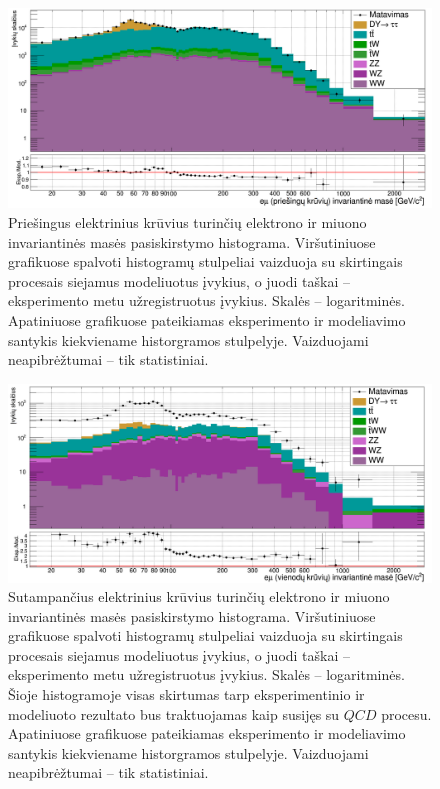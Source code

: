 \documentclass[a4paper, 12pt]{article}
\newcommand{\QCD}{QC\! D}
\begin{document}
\begin{figure}[H]
	\includegraphics[width=\linewidth]{emuMassOS_BIG.png}
	\caption{\label{fig:emuOS} \small
		Priešingus elektrinius krūvius turinčių elektrono ir miuono invariantinės masės pasiskirstymo histograma.
		Viršutiniuose grafikuose spalvoti histogramų stulpeliai vaizduoja su skirtingais procesais siejamus modeliuotus įvykius,
		o juodi taškai -- eksperimento metu užregistruotus įvykius.
		Skalės -- logaritminės.
		Apatiniuose grafikuose pateikiamas eksperimento ir modeliavimo santykis kiekviename historgramos stulpelyje.
		Vaizduojami neapibrėžtumai -- tik statistiniai.
	}
\end{figure}

\begin{figure}[H]
	\includegraphics[width=\linewidth]{emuMassSS_BIG.png}
	\caption{\label{fig:emuSS} \small
		Sutampančius elektrinius krūvius turinčių elektrono ir miuono invariantinės masės pasiskirstymo histograma.
		Viršutiniuose grafikuose spalvoti histogramų stulpeliai vaizduoja su skirtingais procesais siejamus modeliuotus įvykius,
		o juodi taškai -- eksperimento metu užregistruotus įvykius.
		Skalės -- logaritminės.
		Šioje histogramoje visas skirtumas tarp eksperimentinio ir modeliuoto rezultato bus traktuojamas kaip susijęs su
		$\QCD$ procesu.
		Apatiniuose grafikuose pateikiamas eksperimento ir modeliavimo santykis kiekviename historgramos stulpelyje.
		Vaizduojami neapibrėžtumai -- tik statistiniai.
	}
\end{figure}
\end{document}
